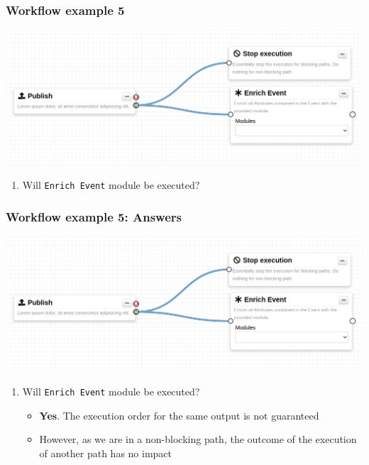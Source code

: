 \begin{frame}
    \frametitle{Workflow example 5}
    \begin{center}
        \includegraphics[width=0.9\linewidth]{pictures/example-5.png}
    \end{center}
    \begin{enumerate}
        \item Will \texttt{Enrich Event} module be executed?
    \end{enumerate}
\end{frame}
\begin{frame}
    \frametitle{Workflow example 5: Answers}
    \begin{center}
        \includegraphics[width=0.9\linewidth]{pictures/example-5.png}
    \end{center}
    \begin{enumerate}
        \item Will \texttt{Enrich Event} module be executed?
        \begin{itemize}
            \item \textbf{Yes}. The execution order for the same output is not guaranteed
            \item However, as we are in a non-blocking path, the outcome of the execution of another path has no impact
        \end{itemize}
    \end{enumerate}
\end{frame}

